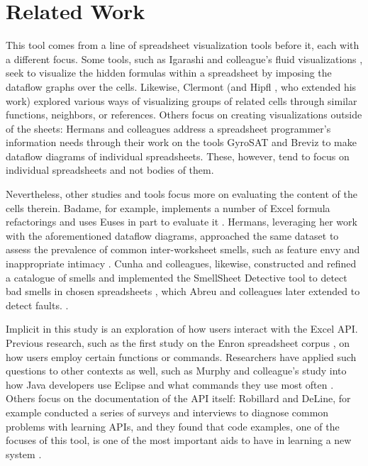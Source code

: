 \documentclass[conference]{IEEEtran}
\begin{document}
\section{Related Work}
This tool comes from a line of spreadsheet visualization tools before it, each with a different focus. Some tools, such as Igarashi and colleague's fluid visualizations \cite{igarashi1998fluid}, seek to visualize the hidden formulas within a spreadsheet by imposing the dataflow graphs over the cells. Likewise, Clermont \cite{clermont2003scalable} (and Hipfl \cite{hipfl2008using}, who extended his work) explored various ways of visualizing groups of related cells through similar functions, neighbors, or references. Others focus on creating visualizations outside of the sheets: Hermans and colleagues address a spreadsheet programmer's information needs through their work on the tools GyroSAT \cite{hermans2011supporting} and Breviz \cite{hermans2011breviz} to make dataflow diagrams of individual spreadsheets. These, however, tend to focus on individual spreadsheets and not bodies of them. \par
Nevertheless, other studies and tools focus more on evaluating the content of the cells therein. Badame, for example, implements a number of Excel formula refactorings and uses Euses in part to evaluate it \cite{badame2012refactoring}. Hermans, leveraging her work with the aforementioned dataflow diagrams, approached the same dataset to assess the prevalence of common inter-worksheet smells, such as feature envy and inappropriate intimacy \cite{hermans2012detecting}. Cunha and colleagues, likewise, constructed and refined a catalogue of smells and implemented the SmellSheet Detective tool to detect bad smells in chosen spreadsheets \cite{cunha2012towards}, which Abreu and colleagues later extended to detect faults. \cite{abreu2014smelling}.\par
Implicit in this study is an exploration of how users interact with the Excel API. Previous research, such as the first study on the Enron spreadsheet corpus \cite{hermans2015enron}, on how users employ certain functions or commands. Researchers have applied such questions to other contexts as well, such as Murphy and colleague's study into how Java developers use Eclipse and what commands they use most often \cite{murphy2006java}.  Others focus on the documentation of the API itself: Robillard and DeLine, for example conducted a series of surveys and interviews to diagnose common problems with learning APIs, and they found that code examples, one of the focuses of this tool, is one of the most important aids to have in learning a new system \cite{robillard2011field}.
\end{document}
